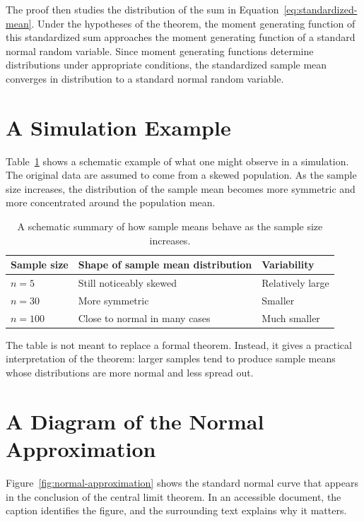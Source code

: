 The proof then studies the distribution of the sum in Equation~\ref{eq:standardized-mean}. Under the hypotheses of the theorem, the moment generating function of this standardized sum approaches the moment generating function of a standard normal random variable. Since moment generating functions determine distributions under appropriate conditions, the standardized sample mean converges in distribution to a standard normal random variable.

\section{A Simulation Example}
\label{sec:clt-simulation}

Table~\ref{tab:clt-simulation} shows a schematic example of what one might observe in a simulation. The original data are assumed to come from a skewed population. As the sample size increases, the distribution of the sample mean becomes more symmetric and more concentrated around the population mean.

\begin{table}[htbp]
\caption{A schematic summary of how sample means behave as the sample size increases.}
\label{tab:clt-simulation}
\centering
\begin{tabular}{lll}
\toprule
Sample size & Shape of sample mean distribution & Variability \\
\midrule
\(n=5\)   & Still noticeably skewed      & Relatively large \\
\(n=30\)  & More symmetric               & Smaller \\
\(n=100\) & Close to normal in many cases & Much smaller \\
\bottomrule
\end{tabular}
\end{table}

The table is not meant to replace a formal theorem. Instead, it gives a practical interpretation of the theorem: larger samples tend to produce sample means whose distributions are more normal and less spread out.

\section{A Diagram of the Normal Approximation}
\label{sec:normal-approximation-diagram}

Figure~\ref{fig:normal-approximation} shows the standard normal curve that appears in the conclusion of the central limit theorem. In an accessible document, the caption identifies the figure, and the surrounding text explains why it matters.

